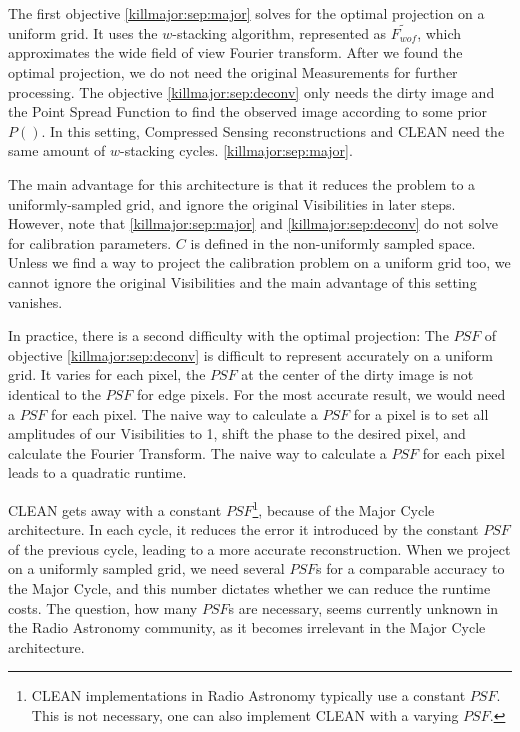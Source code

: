 The first objective \eqref{killmajor:sep:major} solves for the optimal projection on a uniform grid. It uses the $w$-stacking algorithm, represented as $\tilde{F_{wof}}$, which approximates the wide field of view Fourier transform. After we found the optimal projection, we do not need the original Measurements for further processing. The objective \eqref{killmajor:sep:deconv} only needs the dirty image and the Point Spread Function to find the observed image according to some prior $P()$. In this setting, Compressed Sensing reconstructions and CLEAN need the same amount of $w$-stacking cycles.  \eqref{killmajor:sep:major}. 

The main advantage for this architecture is that it reduces the problem to a uniformly-sampled grid, and ignore the original Visibilities in later steps. However, note that \eqref{killmajor:sep:major} and \eqref{killmajor:sep:deconv} do not solve for calibration parameters. $C$ is defined in the non-uniformly sampled space. Unless we find a way to project the calibration problem on a uniform grid too, we cannot ignore the original Visibilities and the main advantage of this setting vanishes. 

In practice, there is a second difficulty with the optimal projection: The $PSF$ of objective \eqref{killmajor:sep:deconv} is difficult to represent accurately on a uniform grid. It varies for each pixel, the $PSF$ at the center of the dirty image is not identical to the $PSF$ for edge pixels. For the most accurate result, we would need a $PSF$ for each pixel. The naive way to calculate a $PSF$ for a pixel is to set all amplitudes of our Visibilities to 1, shift the phase to the desired pixel, and calculate the Fourier Transform. The naive way to calculate a $PSF$ for each pixel leads to a quadratic runtime.

CLEAN gets away with a constant $PSF$\footnote{CLEAN implementations in Radio Astronomy typically use a constant $PSF$. This is not necessary, one can also implement CLEAN with a varying $PSF$.}, because of the Major Cycle architecture. In each cycle, it reduces the error it introduced by the constant $PSF$ of the previous cycle, leading to a more accurate reconstruction. When we project on a uniformly sampled grid, we need several $PSF$s for a comparable accuracy to the Major Cycle, and this number dictates whether we can reduce the runtime costs. The question, how many $PSF$s are necessary, seems currently unknown in the Radio Astronomy community, as it becomes irrelevant in the Major Cycle architecture. 



